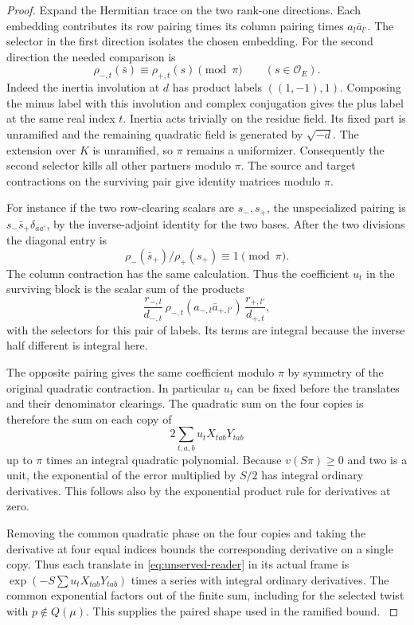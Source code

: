 \begin{proof}
Expand the Hermitian trace on the two rank-one directions.
Each embedding contributes its row pairing times its column
pairing times \(a_l\overline{a}_{l'}\). The selector in the
first direction isolates the chosen embedding. For the second
direction the needed comparison is
\[
 \rho_{-,t}(\bar s)\equiv\rho_{+,t}(s)\pmod{\pi}
                  \qquad(s\in\mathcal O_E).
\]
Indeed the inertia involution at \(d\) has product labels
\(((1,-1),1)\). Composing the minus label with this involution
and complex conjugation gives the plus label at the same real
index \(t\). Inertia acts trivially on the residue field.
Its fixed part is unramified and the remaining quadratic field
is generated by \(\sqrt{-d}\). The extension over \(K\) is
unramified, so \(\pi\) remains a uniformizer.
Consequently the second selector kills all other partners
modulo \(\pi\). The source and target contractions on the surviving
pair give identity matrices modulo \(\pi\).

For instance if the
two row-clearing scalars are \(s_-,s_+\), the unspecialized
pairing is \(s_-\bar s_+\delta_{aa'}\), by the inverse-adjoint
identity for the two bases. After the two divisions the diagonal
entry is 
\[
  \rho_-(\bar s_+)/\rho_+(s_+)\equiv1\pmod\pi.
\]
The column contraction has the same calculation. Thus the
coefficient \(u_t\) in the surviving block is the scalar sum
of the products
\[
 \frac{r_{-,l}}{d_{-,t}}\,
 \rho_{-,t}(a_{-,l}\bar a_{+,l'})\,
 \frac{r_{+,l'}}{d_{+,t}},
\]
with the selectors for this pair of labels. Its terms are
integral because the inverse half different is integral here.

The opposite pairing gives the same coefficient modulo \(\pi\)
by symmetry of the original quadratic contraction. In particular
\(u_t\) can be fixed before the translates and their denominator
clearings. The quadratic sum on the four copies is therefore
the sum on each copy of
\[
        2\sum_{t,a,b}u_t X_{tab}Y_{tab}
\]
up to \(\pi\) times an integral quadratic polynomial. Because
\(v(S\pi)\ge0\) and two is a unit, the exponential of the error
multiplied by \(S/2\) has integral ordinary derivatives. This
follows also by the exponential product rule for derivatives
at zero.

Removing the common quadratic phase on the four
copies and taking the derivative at four equal indices bounds
the corresponding derivative on a single copy. Thus each
translate in \eqref{eq:unserved-reader} in its actual frame
is \(\exp(-S\sum u_tX_{tab}Y_{tab})\) times a series with
integral ordinary derivatives. The common exponential factors
out of the finite sum, including for the selected twist with
\(p\notin Q(\mu)\). This supplies the paired shape used in the
ramified bound. \label{cor:unserved-period-1}

\end{proof}

